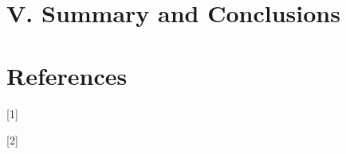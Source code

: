 \documentclass[11pt]{article}
\begin{document}







\section*{V.	Summary and Conclusions} %


\pagebreak
\section*{References}
[1]

[2]


\pagebreak
\end{document}
